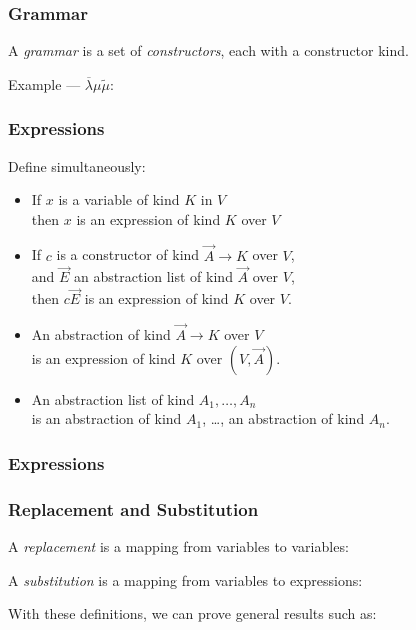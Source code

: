 \documentclass{beamer}
\begin{document}
\begin{frame}
\frametitle{Grammar}
A \emph{grammar} is a set of \emph{constructors}, each with a constructor kind.


Example --- $\overline{\lambda} \mu \tilde{\mu}$:

\end{frame}

\begin{frame}
\frametitle{Expressions}
Define simultaneously:
\begin{itemize}
\item
If $x$ is a variable of kind $K$ in $V$ \\
then $x$ is an expression of kind $K$ over $V$
\item
If $c$ is a constructor of kind $\vec{A} \longrightarrow K$ over $V$, \\
and $\vec{E}$ an abstraction list of kind $\vec{A}$ over $V$, \\
then $c \vec{E}$ is an expression of kind $K$ over $V$.
\item
An abstraction of kind $\vec{A} \rightarrow K$ over $V$ \\
is an expression of kind $K$ over $(V , \vec{A})$.
\item
An abstraction list of kind $A_1, \ldots, A_n$ \\
is an abstraction of kind $A_1$, \ldots, an abstraction of kind $A_n$.
\end{itemize}
\end{frame}

\begin{frame}
\frametitle{Expressions}
\end{frame}

\begin{frame}
\frametitle{Replacement and Substitution}
A \emph{replacement} is a mapping from variables to variables:


A \emph{substitution} is a mapping from variables to expressions:


With these definitions, we can prove general results such as:

\end{frame}
\end{document}

